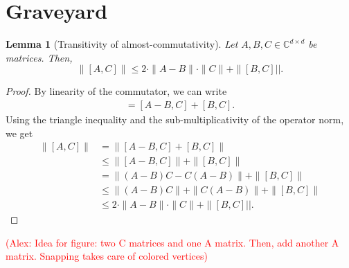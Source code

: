 \documentclass[11pt]{article}
\theoremstyle{plain}
\newtheorem{lemma}[theorem]{Lemma}
\newcommand{\AlexNote}[1]{\textcolor{red}{(Alex: #1)}}
\newcommand{\AlexNote}[1]{}
\begin{document}
\newpage

\printbibliography

\appendix
\section{Graveyard}

\begin{lemma}[Transitivity of almost-commutativity]\label{lem:transitivity-of-almost-commutatitivty}
Let $A,B,C \in \mathbb{C}^{d \times d}$ be matrices. Then,
\begin{equation}
\| [A,C] \| \leq 2 \cdot \|A-B\| \cdot \|C\|+ \| [B,C]||.    
\end{equation}
\end{lemma}
\begin{proof}
By linearity of the commutator, we can write
\begin{align}
[A,C] = [A-B,C] + [B,C].    
\end{align}
Using the triangle inequality and the sub-multiplicativity of the operator norm, we get
\begin{align}
\| [A,C] \| &= \| [A-B,C] + [B,C] \| \\    
&\leq \| [A-B,C]\| + \|[B,C] \| \\
&= \| (A-B)C - C(A-B)\| + \|[B,C] \| \\
&\leq \| (A-B)C\| + \|C(A-B)\| + \|[B,C] \|\\
&\leq 2 \cdot \|A-B\| \cdot \|C\| + \| [B,C]||.
\end{align}
\end{proof}

\AlexNote{Idea for figure: two C matrices and one A matrix. Then, add another A matrix. Snapping takes care of colored vertices}
\end{document}
